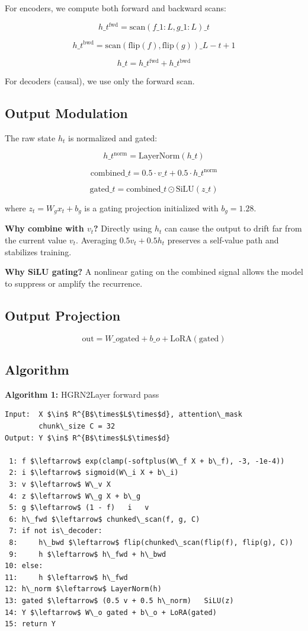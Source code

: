 For encoders, we compute both forward and backward scans:

\[
h\_t^\text{fwd} = \text{scan}(f\_{1:L}, g\_{1:L})\_t
\tag{4.12}
\]

\[
h\_t^\text{bwd} = \text{scan}(\text{flip}(f), \text{flip}(g))\_{L-t+1}
\tag{4.13}
\]

\[
h\_t = h\_t^\text{fwd} + h\_t^\text{bwd}
\tag{4.14}
\]

For decoders (causal), we use only the forward scan.

\subsection{Output Modulation}

The raw state $h_t$ is normalized and gated:

\[
h\_t^\text{norm} = \text{LayerNorm}(h\_t)
\tag{4.15}
\]

\[
\text{combined}\_t = 0.5 \cdot v\_t + 0.5 \cdot h\_t^\text{norm}
\tag{4.16}
\]

\[
\text{gated}\_t = \text{combined}\_t \odot \text{SiLU}(z\_t)
\tag{4.17}
\]

where $z_t = W_g x_t + b_g$ is a gating projection initialized with $b_g = 1.28$.

\textbf{Why combine with $v_t$?} Directly using $h_t$ can cause the output to 
drift far from the current value $v_t$. Averaging $0.5 v_t + 0.5 h_t$ 
preserves a self-value path and stabilizes training.

\textbf{Why SiLU gating?} A nonlinear gating on the combined signal allows the 
model to suppress or amplify the recurrence.

\subsection{Output Projection}

\[
\text{out} = W\_o \text{gated} + b\_o + \text{LoRA}(\text{gated})
\tag{4.18}
\]

\subsection{Algorithm}

\textbf{Algorithm 1:} HGRN2Layer forward pass
\begin{lstlisting}
Input:  X $\in$ R^{B$\times$L$\times$d}, attention\_mask
        chunk\_size C = 32
Output: Y $\in$ R^{B$\times$L$\times$d}

 1: f $\leftarrow$ exp(clamp(-softplus(W\_f X + b\_f), -3, -1e-4))
 2: i $\leftarrow$ sigmoid(W\_i X + b\_i)
 3: v $\leftarrow$ W\_v X
 4: z $\leftarrow$ W\_g X + b\_g
 5: g $\leftarrow$ (1 - f)   i   v
 6: h\_fwd $\leftarrow$ chunked\_scan(f, g, C)
 7: if not is\_decoder:
 8:     h\_bwd $\leftarrow$ flip(chunked\_scan(flip(f), flip(g), C))
 9:     h $\leftarrow$ h\_fwd + h\_bwd
10: else:
11:     h $\leftarrow$ h\_fwd
12: h\_norm $\leftarrow$ LayerNorm(h)
13: gated $\leftarrow$ (0.5 v + 0.5 h\_norm)   SiLU(z)
14: Y $\leftarrow$ W\_o gated + b\_o + LoRA(gated)
15: return Y
\end{lstlisting}

